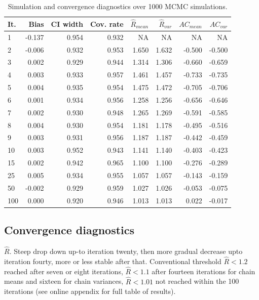 \documentclass[article]{jss}
\begin{document}
\begin{table}[ht]
\centering
\caption{Simulation and convergence diagnostics over 1000 MCMC simulations.} 
\label{tab:results}
\begin{tabular}{lrrrrrrr}
  \hline
It. & Bias & CI width & Cov. rate & $\widehat{R}_{mean}$ & $\widehat{R}_{var}$ & $AC_{mean}$ & $AC_{var}$ \\ 
  \hline
   1 & -0.137 & 0.954 & 0.932 & NA & NA & NA & NA \\ 
     2 & -0.006 & 0.932 & 0.953 & 1.650 & 1.632 & -0.500 & -0.500 \\ 
     3 & 0.002 & 0.929 & 0.944 & 1.314 & 1.306 & -0.660 & -0.659 \\ 
     4 & 0.003 & 0.933 & 0.957 & 1.461 & 1.457 & -0.733 & -0.735 \\ 
     5 & 0.004 & 0.935 & 0.954 & 1.475 & 1.472 & -0.705 & -0.706 \\ 
     6 & 0.001 & 0.934 & 0.956 & 1.258 & 1.256 & -0.656 & -0.646 \\ 
     7 & 0.002 & 0.930 & 0.948 & 1.265 & 1.269 & -0.591 & -0.585 \\ 
     8 & 0.004 & 0.930 & 0.954 & 1.181 & 1.178 & -0.495 & -0.516 \\ 
     9 & 0.003 & 0.931 & 0.956 & 1.187 & 1.187 & -0.442 & -0.459 \\ 
    10 & 0.003 & 0.952 & 0.943 & 1.141 & 1.140 & -0.403 & -0.423 \\ 
    15 & 0.002 & 0.942 & 0.965 & 1.100 & 1.100 & -0.276 & -0.289 \\ 
    25 & 0.005 & 0.934 & 0.955 & 1.057 & 1.057 & -0.143 & -0.159 \\ 
    50 & -0.002 & 0.929 & 0.959 & 1.027 & 1.026 & -0.053 & -0.075 \\ 
   100 & 0.000 & 0.920 & 0.946 & 1.013 & 1.013 & 0.022 & -0.017 \\ 
   \hline
\end{tabular}
\end{table}


\subsection{Convergence diagnostics}

\textbf{$\widehat{R}$}. Steep drop down up-to iteration twenty, then more gradual decrease upto iteration fourty, more or less stable after that. Conventional threshold $\widehat{R} < 1.2$ reached after seven or eight iterations, $\widehat{R} < 1.1$ after fourteen iterations for chain means and sixteen for chain variances, $\widehat{R} < 1.01$ not reached within the 100 iterations (see online appendix for full table of results). 
\end{document}
